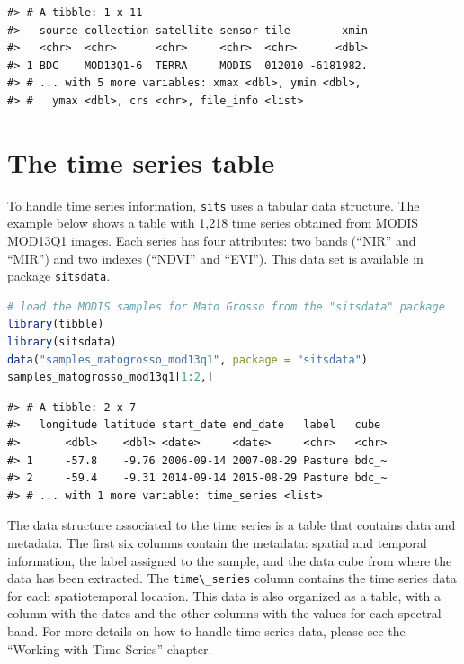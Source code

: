 \documentclass[
  11pt,
]{report}
\newcommand{\passthrough}[1]{#1}
\begin{document}
\begin{lstlisting}
#> # A tibble: 1 x 11
#>   source collection satellite sensor tile        xmin
#>   <chr>  <chr>      <chr>     <chr>  <chr>      <dbl>
#> 1 BDC    MOD13Q1-6  TERRA     MODIS  012010 -6181982.
#> # ... with 5 more variables: xmax <dbl>, ymin <dbl>,
#> #   ymax <dbl>, crs <chr>, file_info <list>
\end{lstlisting}

\hypertarget{the-time-series-table}{%
\section*{The time series table}\label{the-time-series-table}}

To handle time series information, \passthrough{\lstinline!sits!} uses a
tabular data structure. The example below shows a table with 1,218 time
series obtained from MODIS MOD13Q1 images. Each series has four
attributes: two bands (``NIR'' and ``MIR'') and two indexes (``NDVI''
and ``EVI''). This data set is available in package
\passthrough{\lstinline!sitsdata!}.

\begin{lstlisting}[language=R]
# load the MODIS samples for Mato Grosso from the "sitsdata" package
library(tibble)
library(sitsdata)
data("samples_matogrosso_mod13q1", package = "sitsdata")
samples_matogrosso_mod13q1[1:2,]
\end{lstlisting}

\begin{lstlisting}
#> # A tibble: 2 x 7
#>   longitude latitude start_date end_date   label   cube 
#>       <dbl>    <dbl> <date>     <date>     <chr>   <chr>
#> 1     -57.8    -9.76 2006-09-14 2007-08-29 Pasture bdc_~
#> 2     -59.4    -9.31 2014-09-14 2015-08-29 Pasture bdc_~
#> # ... with 1 more variable: time_series <list>
\end{lstlisting}

The data structure associated to the time series is a table that
contains data and metadata. The first six columns contain the metadata:
spatial and temporal information, the label assigned to the sample, and
the data cube from where the data has been extracted. The
\passthrough{\lstinline!time\_series!} column contains the time series
data for each spatiotemporal location. This data is also organized as a
table, with a column with the dates and the other columns with the
values for each spectral band. For more details on how to handle time
series data, please see the ``Working with Time Series'' chapter.
\end{document}
